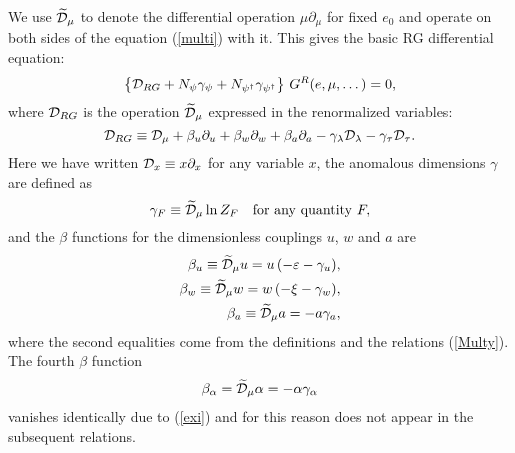 \documentclass[12pt]{iopart}
\def\Dm{\widetilde{\cal D}_{\mu}}
\begin{document}
We use $\widetilde{\cal D}_{\mu}$ to denote the differential operation
$\mu\partial_{\mu}$ for fixed $e_{0}$ and operate on both sides of the
equation (\ref{multi}) with it. This gives the basic RG differential
equation:
\begin{equation}
\left\{ {\cal D}_{RG} + N_{\psi} \gamma_{\psi} +
N_{\psi^{\dag}} \gamma_{\psi^{\dag}} \right\}
\,G^{R}(e,\mu,\dots) = 0,
\label{RG1}
\end{equation}
where ${\cal D}_{RG}$ is the operation $\widetilde{\cal D}_{\mu}$
expressed in the renormalized variables:
\begin{equation}
{\cal D}_{RG}\equiv {\cal D}_{\mu} + \beta_{u}\partial_{u} +
\beta_{w}\partial_{w}  + \beta_{a}\partial_{a} -
\gamma_{\lambda}{\cal D}_{\lambda} - \gamma_{\tau}{\cal D}_{\tau}.
\label{RG2}
\end{equation}
Here we have written ${\cal D}_{x}\equiv x\partial_{x}$ for any variable
$x$, the anomalous dimensions $\gamma$ are defined as
\begin{equation}
\gamma_{F}\equiv \Dm \ln Z_{F} \quad {\rm for\ any\ quantity} \ F,
\label{RGF1}
\end{equation}
and the $\beta$ functions for the dimensionless couplings $u$, $w$ and
$a$ are
\begin{eqnarray}
\beta_{u} \equiv \widetilde {\cal D}_{\mu} u = u\, (-\varepsilon-\gamma_{u}),
\nonumber \\
\beta_{w} \equiv \widetilde {\cal D}_{\mu} w = w\,(-\xi-\gamma_{w}),
\nonumber \\
\beta_{a} \equiv \widetilde {\cal D}_{\mu} a = -a\gamma_{a},
\label{betagw}
\end{eqnarray}
where the second equalities come from the definitions and the
relations (\ref{Multy}). The fourth $\beta$ function
\begin{eqnarray}
\beta_{\alpha}=\widetilde{\cal D}_{\mu}\alpha=-\alpha\gamma_{\alpha}
\label{Bal}
\end{eqnarray}
vanishes identically due to (\ref{exi}) and for this reason does not
appear in the subsequent relations.
\end{document}
